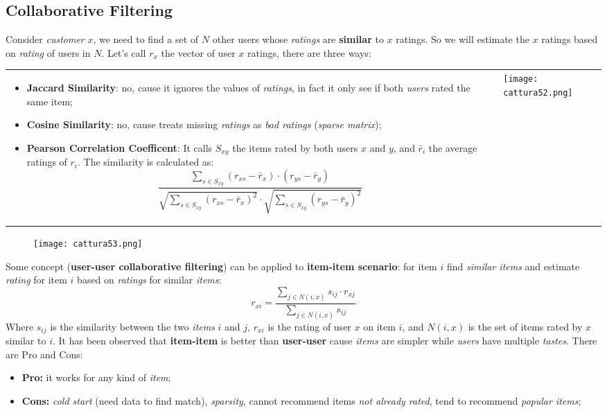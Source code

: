 \documentclass{article}
\begin{document}
\subsection{Collaborative Filtering}
Consider \emph{customer} $x$, we need to find a set of $N$ other users whose \emph{ratings} are \textbf{similar} to $x$ ratings. So we will estimate the $x$ ratings based on \emph{rating} of users in $N$. Let's call $r_x$ the vector of user $x$ ratings, there are three ways:\\
\begin{tabular}{C{7cm}  L{8cm}}
\begin{itemize}
\item \textbf{Jaccard Similarity}: no, cause it ignores the values of \emph{ratings}, in fact it only see if both \emph{users} rated the same item;
\item \textbf{Cosine Similarity}: no, cause treats missing \emph{ratings} as \emph{bad ratings} (\emph{sparse matrix});
\item \textbf{Pearson Correlation Coefficent}: It calls $S_{xy}$ the items rated by both users $x$ and $y$, and $\bar{r}_i$ the average ratings of $r_i$. The similarity is calculated as:
\[ \frac{\sum_{s \in S_{xy}} (r_{xs} - \bar{r}_x)\cdot(r_{ys} - \bar{r}_y)}
{\sqrt{ {\sum_{s \in S_{xy}} (r_{xs} - \bar{r}_x)^2}} \cdot \sqrt{\sum_{s \in S_{xy}} (r_{ys} - \bar{r}_y)^2}}\]
\end{itemize}
& \texttt{[image: cattura52.png]}
\end{tabular}
\begin{figure}[H]
  \centering
  \texttt{[image: cattura53.png]}
\end{figure}
Some concept (\textbf{user-user collaborative filtering}) can be applied to \textbf{item-item scenario}: for item $i$ find \emph{similar items} and estimate \emph{rating} for item $i$ based on \emph{ratings} for similar \emph{items}:
\[
r_{xi} = \frac{
\sum_{j \in N(i,x)} s_{ij} \cdot r_{xj}
}
{\sum_{j \in N(i,x)} s_{ij} }\]
Where $s_{ij}$ is the similarity between the two \emph{items} $i$ and $j$, $r_{xi}$ is the rating of user $x$ on item $i$, and $N(i,x)$ is the set of items rated by $x$ similar to $i$. It has been observed that \textbf{item-item} is better than \textbf{user-user} cause \emph{items} are simpler while \emph{users} have multiple \emph{tastes}. There are Pro and Cons:
\begin{itemize}
\item \textbf{Pro:} it works for any kind of \emph{item};
\item \textbf{Cons:} \emph{cold start} (need data to find match), \emph{sparsity}, cannot recommend items \emph{not already rated}, tend to recommend \emph{popular items};
\end{itemize}
\end{document}
